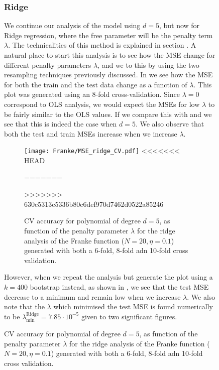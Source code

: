 \begin{figure}
        

        \subsubsection{Ridge}\label{sec:rigdeanalysis}

        We continue our analysis of the model using $d=5$, but now for Ridge regression, where the free parameter will be the penalty term $\lambda$. The technicalities of this method is explained in section . A natural place to start this analysis is to see how the MSE change for different penalty parameters $\lambda$, and we to this by using the two resampling techniques previously discussed. In  we see how the MSE for both the train and the test data change as a function of $\lambda$. This plot was generated using an 8-fold cross-validation. Since $\lambda=0$ correspond to OLS analysis, we would expect the MSEs for low $\lambda$ to be fairly similar to the OLS values. If we compare this with  and  we see that this is indeed the case when $d=5$. We also observe that both the test and train MSEs increase when we increase $\lambda$. 

        \begin{figure}
            \texttt{[image: Franke/MSE\_ridge\_CV.pdf]}
<<<<<<< HEAD
            \caption{MSE for train and test data for polynomial of degree $d=5$, as function of the penalty parameter $\lambda$ for the Ridge analysis of the Franke function ($N=20, \eta=0.1$) generated with an 8-fold cross-validation. For small $\lambda$ the train MSE and test MSE are close the OLS values, but both increase when we increase $\lambda$.}
=======
            \caption{CV accuracy for polynomial of degree $d=5$, as function of the penalty parameter $\lambda$ for the ridge analysis of the Franke function ($N=20, \eta=0.1$) generated with both a 6-fold, 8-fold adn 10-fold cross validation.}
>>>>>>> 630c5313c5336b80c6def970d7462d0522a85246
            \label{fig:cross-validation_ridge}
        \end{figure}

        However, when we repeat the analysis but generate the plot using a $k=400$ bootstrap instead, as shown in , we see that the test MSE decrease to a minimum and remain low when we increase $\lambda$. We also note that the $\lambda$ which minimised the test MSE is found numerically to be $\lambda_\mathrm{min}^\mathrm{Ridge} = 7.85\cdot10^{-5}$ given to two significant figures. 



\end{figure}
